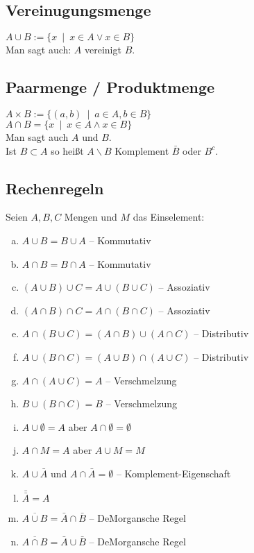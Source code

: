 \subsection{Vereinugungsmenge}
$A \cup B := \{ x \enspace | \enspace x \in A \vee x \in B \}$ \\
Man sagt auch: $A$ vereinigt $B$.

\subsection{Paarmenge / Produktmenge}
$A \times B := \{ (a,b) \enspace | \enspace a \in A, b \in B \}$\\
$A \cap B = \{ x \enspace | \enspace x \in A \wedge x \in B \}$\\
Man sagt auch $A$ und $B$.\\
Ist $B \subset A$ so heißt $A \backslash B$ Komplement $\bar{B}$ oder $B^c$.

\subsection{Rechenregeln}
Seien $A,B,C$ Mengen und $M$ das Einselement:
\begin{enumerate}[a)]
\item $A \cup B = B \cup A$ -- Kommutativ
\item $A \cap B = B \cap A$ -- Kommutativ
\item $(A \cup B) \cup C = A \cup ( B \cup C)$ -- Assoziativ
\item $(A \cap B) \cap C = A \cap ( B \cap C)$ -- Assoziativ
\item $A \cap (B \cup C) = (A \cap B) \cup (A \cap C)$ -- Distributiv
\item $A \cup (B \cap C) = (A \cup B) \cap (A \cup C)$ -- Distributiv
\item $A \cap (A \cup C) = A$ -- Verschmelzung
\item $B \cup (B \cap C) = B$ -- Verschmelzung
\item $A \cup \emptyset = A$ aber $A \cap \emptyset = \emptyset$
\item $A \cap M = A$ aber $A \cup M = M$
\item $A \cup \bar{A}$ und $A \cap \bar{A} = \emptyset$ -- Komplement-Eigenschaft
\item $\bar{\bar{A}} = A$
\item $\overline{A \cup B} = \bar{A} \cap \bar{B}$ -- DeMorgansche Regel
\item $\overline{A \cap B} = \bar{A} \cup \bar{B}$ -- DeMorgansche Regel
\end{enumerate}


